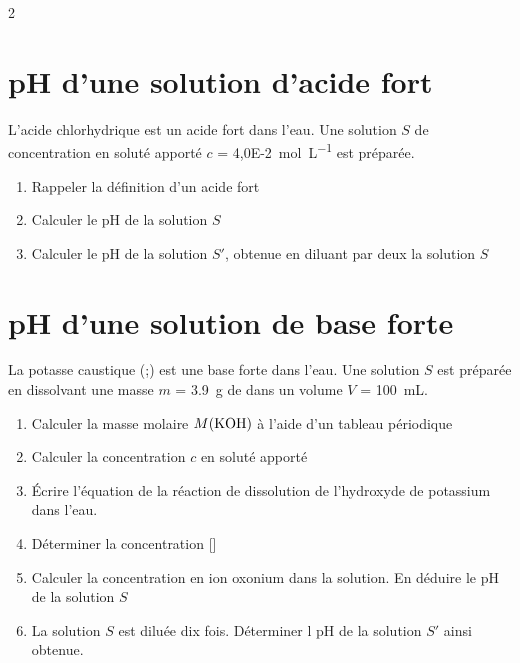 \documentclass[a4paper,11pt,fleqn]{article}%
\begin{document}
\maketitle

\begin{multicols}{2}
\section{pH d'une solution d'acide fort}
L'acide chlorhydrique est un acide fort dans l'eau. Une solution $S$ de concentration en soluté apporté $c$ = \SI{4,0E-2}{\mole \per \liter} est préparée.
\begin{enumerate}
	\item Rappeler la définition d'un acide fort
	\item Calculer le pH de la solution $S$
	\item Calculer le pH de la solution $S'$, obtenue en diluant par deux la solution $S$
\end{enumerate}

\section{pH d'une solution de base forte}
La potasse caustique (;) est une base forte dans l'eau. Une solution $S$ est préparée en dissolvant une masse $m$ = \SI{3,9}{\gram} de  dans un volume $V$ = \SI{100}{\milli \liter}.
\begin{enumerate}
	\item Calculer la masse molaire $M(\ce{KOH})$ à l'aide d'un tableau périodique
	\item Calculer la concentration $c$ en soluté apporté
	\item Écrire l'équation de la réaction de dissolution de l'hydroxyde de potassium  dans l'eau.
	\item Déterminer la concentration []
	\item Calculer la concentration en ion oxonium dans la solution. En déduire le pH de la solution $S$
	\item La solution $S$ est diluée dix fois. Déterminer l pH de la solution $S'$ ainsi obtenue.
\end{enumerate}


\end{multicols}
\end{document}
